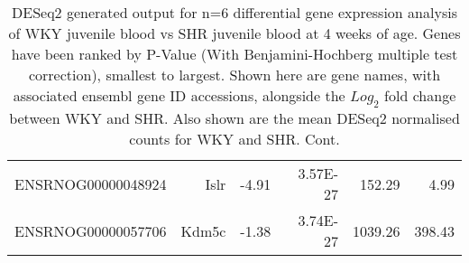 \begin{sidewaystable}[]
\begin{tabular}{lrrrrr}
ENSRNOG00000048924 & Islr        & -4.91            & 3.57E-27           & 152.29            & 4.99              \\
ENSRNOG00000057706 & Kdm5c       & -1.38            & 3.74E-27           & 1039.26           & 398.43           
\end{tabular}
\caption[DESeq2 generated output for n=6 differential gene expression analysis of WKY juvenile blood vs SHR juvenile blood at 4 weeks of age. Cont.]{DESeq2 generated output for n=6 differential gene expression analysis of WKY juvenile blood vs SHR juvenile blood at 4 weeks of age. Genes have been ranked by P-Value (With Benjamini-Hochberg multiple test correction), smallest to largest. Shown here are gene names, with associated ensembl gene ID accessions, alongside the $Log_{2}$ fold change between WKY and SHR. Also shown are the mean DESeq2 normalised counts for WKY and SHR. Cont.}
\label{fig:n6RNAseq}
\end{sidewaystable}

